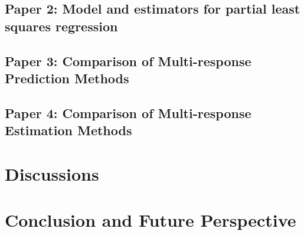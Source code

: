 \documentclass[11pt,twoside,openright,titlepage,
  headinclude,footinclude,BCOR=5mm,
  numbers=noenddot,cleardoublepage=empty,
  tablecaptionabove, dottedtoc,
  bibliography=totoc]{scrreprt}
\begin{document}
\hypertarget{paper-2-model-and-estimators-for-partial-least-squares-regression}{%
\section{Paper 2: Model and estimators for partial least squares regression}\label{paper-2-model-and-estimators-for-partial-least-squares-regression}}

\hypertarget{paper-3-comparison-of-multi-response-prediction-methods}{%
\section{Paper 3: Comparison of Multi-response Prediction Methods}\label{paper-3-comparison-of-multi-response-prediction-methods}}

\hypertarget{paper-4-comparison-of-multi-response-estimation-methods}{%
\section{Paper 4: Comparison of Multi-response Estimation Methods}\label{paper-4-comparison-of-multi-response-estimation-methods}}

\hypertarget{discussions}{%
\chapter{Discussions}\label{discussions}}

\hypertarget{conclusion-and-future-perspective}{%
\chapter{Conclusion and Future Perspective}\label{conclusion-and-future-perspective}}

  \renewcommand\refname{References}
  


\nocite{*}

\appendix

\end{document}
